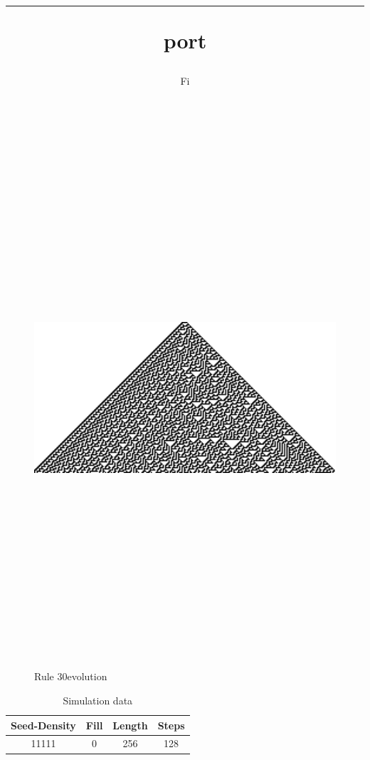 \documentclass[12pt, letterpaper]{article}
\title{ \rule report}
\author{Fi }
\renewcommand{\rule}{Rule 30}
\begin{document}
 
\begin{titlepage} 
\maketitle 
\tableofcontents 
\end{titlepage} 
\clearpage 
\begin{figure}[H]
  \centering
  \includegraphics[height=200mm, width=200mm, keepaspectratio]{simAnalysis.png} 
   \caption{\rule evolution} 
\end{figure}
\begin{table}[H]
  \centering
  \begin{tabular}{|c|c|c|c| }
     \hline Seed-Density & Fill & Length & Steps \\ 
      \hline 11111 & 0 & 256 & 128 \\ 
      \hline 
       \end{tabular} 
      \caption{Simulation data} 
    \end{table} 
\end{document}
